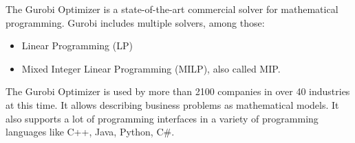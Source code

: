 \documentclass[../../thesis.tex]{subfiles}
\begin{document}
The Gurobi Optimizer \cite{gurobi} is a state-of-the-art commercial solver for mathematical programming. 
Gurobi includes multiple solvers, among those:

\begin{itemize}
  \item Linear Programming (LP)
  \item Mixed Integer Linear Programming (MILP), also called MIP.
\end{itemize}

The Gurobi Optimizer is used by more than 2100 companies in over 40 industries at this time. It allows 
describing business problems as mathematical models. It also supports a lot of programming interfaces
in a variety of programming languages like C++, Java, Python, C\#.
\end{document}
